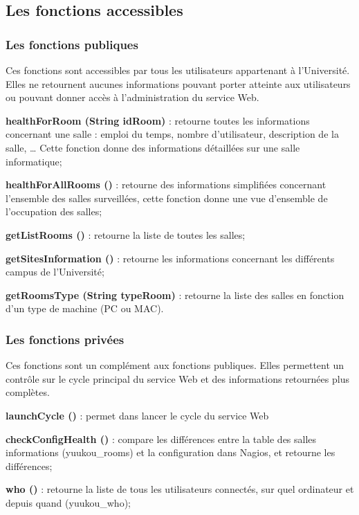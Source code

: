 \subsection{Les fonctions accessibles}

\subsubsection{Les fonctions publiques}
\label{section:fonctionsPubliques}

Ces fonctions sont accessibles par tous les utilisateurs appartenant \`a l'Universit\'e.
Elles ne retournent aucunes informations pouvant porter atteinte aux utilisateurs ou pouvant donner acc\`es \`a l'administration du service Web.

\noindent\textbf{healthForRoom (String idRoom)} : retourne toutes les informations concernant une salle : emploi du temps, nombre d'utilisateur, description de la salle, {\ldots} Cette fonction donne des informations d\'etaill\'ees sur une salle informatique;

\noindent\textbf{healthForAllRooms ()} : retourne des informations simplifi\'ees concernant l'ensemble des salles surveill\'ees, cette fonction donne une vue d'ensemble de l'occupation des salles;

\noindent\textbf{getListRooms ()} : retourne la liste de toutes les salles;

\noindent\textbf{getSitesInformation ()} : retourne les informations concernant les diff\'erents campus de l'Universit\'e;

\noindent\textbf{getRoomsType (String typeRoom)} : retourne la liste des salles en fonction d'un type de machine (PC ou MAC).

\subsubsection{Les fonctions priv\'ees}

Ces fonctions sont un compl\'ement aux fonctions publiques.
Elles permettent un contr\^ole sur le cycle principal du service Web et des informations retourn\'ees plus compl\`etes.

\noindent\textbf{launchCycle ()} : permet dans lancer le cycle du service Web

\noindent\textbf{checkConfigHealth ()} : compare les diff\'erences entre la table des salles informations (\textsf{yuukou\_rooms}) et la configuration dans Nagios, et retourne les diff\'erences;

\noindent\textbf{who ()} : retourne la liste de tous les utilisateurs connect\'es, sur quel ordinateur et depuis quand (\textsf{yuukou\_who});

